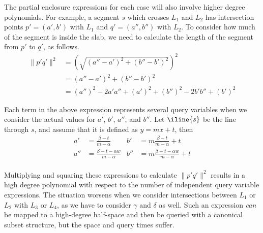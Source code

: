 The partial enclosure expressions for each case will also involve higher degree polynomials.
For example, a segment $s$ which crosses $L_1$ and $L_2$ has intersection points $p' = (a', b')$ with $L_1$ and $q' = (a'', b'')$ with $L_2$.  
To consider how much of the segment is inside the slab, we need to calculate the length of the segment from $p'$ to $q'$, as follows.
\[
\begin{split}
\|p'q'\|^2 
&= \left( \sqrt{(a'' - a')^2 + (b'' - b')^2} \right)^2 \\
%
&= (a'' - a')^2 + (b'' - b')^2 \\
%
&= (a'')^2 - 2a'a'' + (a')^2 + (b'')^2 - 2b'b'' + (b')^2
\end{split}
\]

Each term in the above expression represents several query variables when we consider the actual values for $a'$, $b'$, $a''$, and $b''$.  
Let $\iline{s}$ be the line through $s$, and assume that it is defined as $y = mx + t$, then
\begin{align*}
a'  &= \frac{\beta - t}{m - \alpha}
&b'  &= m \frac{\beta - t}{m - \alpha} + t \\
a'' &= \frac{\beta - t - \alpha w}{m - \alpha} 
&b'' &= m \frac{\beta - t - \alpha w}{m - \alpha} + t \\
\end{align*}

Multiplying and squaring these expressions to calculate $\|p'q'\|^2$ results in a high degree polynomial with respect to the number of independent query variable expressions.
The situation worsens when we consider intersections between $L_1$ or $L_2$ with $L_3$ or $L_4$, as we have to consider $\gamma$ and $\delta$ as well.
Such an expression \emph{can} be mapped to a high-degree half-space and then be queried with a canonical subset structure, but the space and query times suffer.

